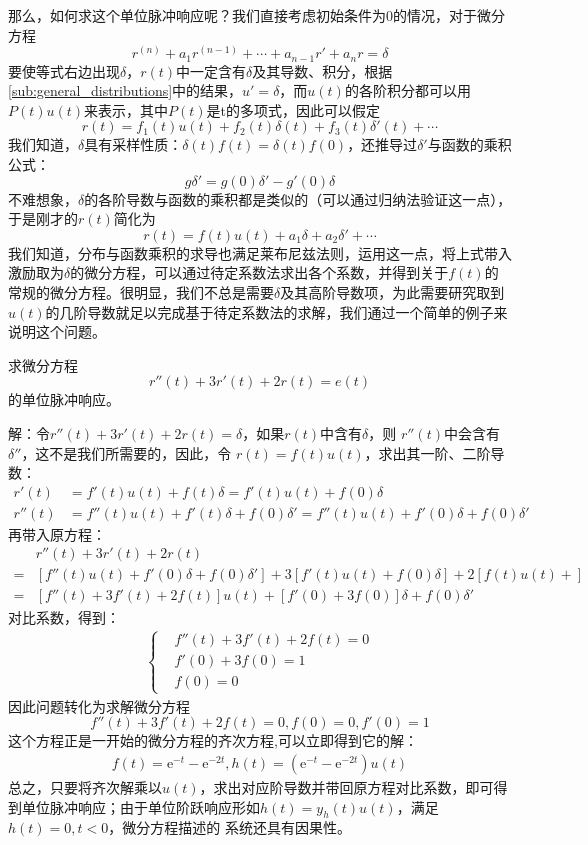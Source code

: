 那么，如何求这个单位脉冲响应呢？我们直接考虑初始条件为0的情况，对于微分方程
\[r^{(n)}+a_{1}r^{(n-1)}+\cdots +a_{n-1} r'+a_n r=\delta\]
要使等式右边出现$\delta$，$r(t)$中一定含有$\delta$及其导数、积分，根据\ref{sub:general_distributions}中的结果，$u'=\delta$，而$u(t)$的各阶积分都可以用$P(t)u(t)$来表示，其中$P(t)$是t的多项式，因此可以假定
$$r(t)=f_1(t)u(t)+f_2(t)\delta(t)+f_3(t)\delta'(t)+\cdots$$
我们知道，$\delta$具有采样性质：$\delta(t)f(t)=\delta(t)f(0)$，还推导过$\delta'$与函数的乘积公式：
$$g\delta'=g(0)\delta'-g'(0)\delta$$
不难想象，$\delta$的各阶导数与函数的乘积都是类似的（可以通过归纳法验证这一点），于是刚才的$r(t)$简化为
\[r(t)=f(t)u(t)+a_1\delta+a_2\delta'+\cdots\]
我们知道，分布与函数乘积的求导也满足莱布尼兹法则，运用这一点，将上式带入激励取为$\delta$的微分方程，可以通过待定系数法求出各个系数，并得到关于$f(t)$的常规的微分方程。很明显，我们不总是需要$\delta$及其高阶导数项，为此需要研究取到$u(t)$的几阶导数就足以完成基于待定系数法的求解，我们通过一个简单的例子来说明这个问题。

\begin{example}
    求微分方程
\[r''(t)+3r'(t)+2r(t)=e(t)\]
的单位脉冲响应。

解：令$r''(t)+3r'(t)+2r(t)=\delta$，如果$r(t)$中含有$\delta$，则
$r''(t)$中会含有$\delta''$，这不是我们所需要的，因此，令
$r(t)=f(t)u(t)$，求出其一阶、二阶导数：\begin{align*}
    r'(t)&=f'(t)u(t)+f(t)\delta=f'(t)u(t)+f(0)\delta\\
    r''(t)&=f''(t)u(t)+f'(t)\delta+f(0)\delta'=f''(t)u(t)+f'(0)\delta+f(0)\delta'
\end{align*}
再带入原方程：\begin{align*}
    &r''(t)+3r'(t)+2r(t)\\
    =&\left[f''(t)u(t)+f'(0)\delta+f(0)\delta'\right]+3\left[f'(t)u(t)+f(0)\delta\right]+2\left[f(t)u(t)+\right]\\
    =&\left[f''(t)+3f'(t)+2f(t)\right]u(t)+\left[f'(0)+3f(0)\right]\delta+f(0)\delta'
\end{align*}
对比系数，得到：\begin{align*}\begin{cases}
    &f''(t)+3f'(t)+2f(t)=0\\
    &f'(0)+3f(0)=1\\
    &f(0)=0
\end{cases}
\end{align*}
因此问题转化为求解微分方程
\[f''(t)+3f'(t)+2f(t)=0,f(0)=0,f'(0)=1\]
这个方程正是一开始的微分方程的齐次方程,可以立即得到它的解：
\begin{align*}
    f(t)=\mathrm{e}^{-t}-\mathrm{e}^{-2t},h(t)=\left(\mathrm{e}^{-t}-\mathrm{e}^{-2t}\right)u(t)
\end{align*}
总之，只要将齐次解乘以$u(t)$，求出对应阶导数并带回原方程对比系数，即可得到单位脉冲响应；由于单位阶跃响应形如$h(t)=y_h(t)u(t)$，满足$h(t)=0,t<0$，微分方程描述的
系统还具有因果性。
\end{example}

